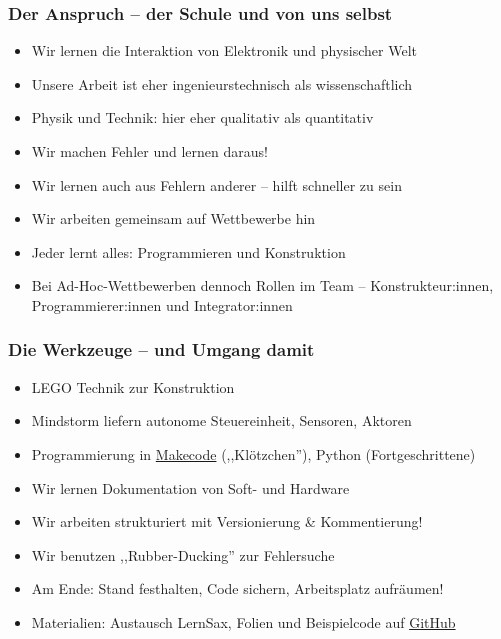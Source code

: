 \documentclass{beamer}
\begin{document}
\begin{frame}
\frametitle{Der Anspruch – der Schule und von uns selbst}
\begin{itemize}
\item  Wir lernen die Interaktion von Elektronik und physischer Welt
\item  Unsere Arbeit ist eher ingenieurstechnisch als wissenschaftlich
\item Physik und Technik: hier eher qualitativ als quantitativ
\item  Wir machen Fehler und lernen daraus!
\item Wir lernen auch aus Fehlern anderer – hilft schneller zu sein
\item  Wir arbeiten gemeinsam auf Wettbewerbe hin
\item  Jeder lernt alles: Programmieren und Konstruktion 
\item  Bei Ad-Hoc-Wettbewerben dennoch Rollen im Team – Konstrukteur:innen, Programmierer:innen und Integrator:innen 
\end{itemize}
\end{frame}

\begin{frame}
\frametitle{Die Werkzeuge – und Umgang damit}
\begin{itemize}
\item  LEGO Technik zur Konstruktion
\item  Mindstorm liefern autonome Steuereinheit, Sensoren, Aktoren
\item Programmierung in \href{https://makecode.mindstorms.com/}{Makecode} (,,Klötzchen''), Python (Fortgeschrittene)
\item  Wir lernen Dokumentation von Soft- und Hardware
\item  Wir arbeiten strukturiert mit Versionierung \& Kommentierung!
\item Wir benutzen ,,Rubber-Ducking'' zur Fehlersuche
\item  Am Ende: Stand festhalten, Code sichern, Arbeitsplatz aufräumen!
\item Materialien: Austausch LernSax, Folien und Beispielcode auf \href{https://github.com/mschlenker/GtaRoboter2020}{GitHub}
\end{itemize}
\end{frame}


\end{document}
